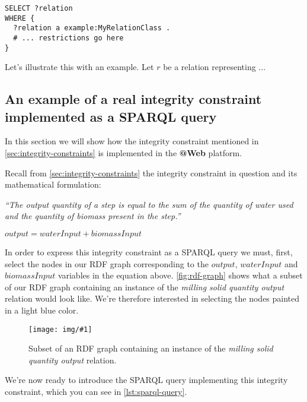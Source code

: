 \documentclass[a4paper, 10pt]{article}
\makeatletter
\newcommand{\atweb}{\textbf{@Web}\xspace}
\newcommand{\img}[3]{
  \begin{figure}[H]
    \centering
    \texttt{[image: img/\#1]}
    \caption{#2}
    \label{#3}
  \end{figure}
}
\makeatother
\begin{document}
\begin{minipage}{\textwidth}
\begin{lstlisting}[label={lst:structure-example},
                   caption={Structure of a SPARQL query implementing an
                            integrity constraint.}]
SELECT ?relation
WHERE {
  ?relation a example:MyRelationClass .
  # ... restrictions go here
}
\end{lstlisting}
\end{minipage}

 Let's illustrate this with an example. Let $r$ be a relation
representing ...


\subsection{An example of a real integrity constraint implemented as a SPARQL
query}

In this section we will show how the integrity constraint mentioned in
\autoref{sec:integrity-constraints} is implemented in the \atweb platform.

Recall from \autoref{sec:integrity-constraints} the integrity constraint in
question and its mathematical formulation:

\begin{center}
  \textit{``The output quantity of a step is equal to the sum of the quantity
  of water used and the quantity of biomass present in the step.''}

  $output = waterInput + biomassInput$
\end{center}

In order to express this integrity constraint as a SPARQL query we must, first,
select the nodes in our RDF graph corresponding to the $output$, $waterInput$
and $biomassInput$ variables in the equation above. \autoref{fig:rdf-graph}
shows what a subset of our RDF graph containing an instance of the
\textit{milling solid quantity output} relation would look like. We're
therefore interested in selecting the nodes painted in a light blue color.

\img{rdf-graph.png}
    {
      Subset of an RDF graph containing an instance of the \textit{milling
      solid quantity output} relation.
    }
    {fig:rdf-graph}

 We're now ready
to introduce the SPARQL query implementing this integrity constraint, which you
can see in \autoref{lst:sparql-query}.
\end{document}
